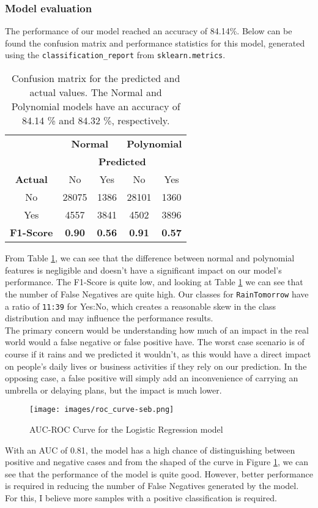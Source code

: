\documentclass[10pt]{article}
\begin{document}
\subsubsection{Model evaluation}
The performance of our model reached an accuracy of 84.14\%. Below can be found the confusion matrix and performance statistics for this model, generated using the \texttt{classification\_report} from \texttt{sklearn.metrics}.
\begin{table}[h]
    \centering
    \begin{tabular}{ccccc} 
 & \multicolumn{2}{c}{\textbf{Normal}}& \multicolumn{2}{c}{\textbf{Polynomial}} \\ 
  &\multicolumn{4}{c}{\textbf{Predicted}} \\ 
          \textbf{Actual}&  No& Yes  & No&Yes \\ 
          No&  28075& 1386& 28101&1360 \\ 
          Yes&  4557& 3841& 4502&3896 \\
 \textbf{F1-Score}& \textbf{0.90}& \textbf{0.56}& \textbf{0.91}& \textbf{0.57}\\ 
    \end{tabular}
    \caption{Confusion matrix for the predicted and actual values. The Normal and Polynomial models have an accuracy of 84.14 \% and 84.32 \%, respectively. }
    \label{tab:confusion_matrix_lreg}
\end{table}
\noindent From Table \ref{tab:confusion_matrix_lreg}, we can see that the difference between normal and polynomial features is negligible and doesn't have a significant impact on our model's performance. The F1-Score is quite low, and looking at Table \ref{tab:confusion_matrix_lreg} we can see that the number of False Negatives are quite high. Our classes for \texttt{RainTomorrow} have a ratio of \texttt{11:39} for Yes:No, which creates a reasonable skew in the class distribution and may influence the performance results. \\
The primary concern would be understanding how much of an impact in the real world would a false negative or false positive have. The worst case scenario is of course if it rains and we predicted it wouldn't, as this would have a direct impact on people's daily lives or business activities if they rely on our prediction. In the opposing case, a false positive will simply add an inconvenience of carrying an umbrella or delaying plans, but the impact is much lower.
\begin{figure}[h]
    \centering
    \texttt{[image: images/roc\_curve-seb.png]}
    \caption{AUC-ROC Curve for the Logistic Regression model}
    \label{fig:roc-seb}
\end{figure}
With an AUC of 0.81, the model has a high chance of distinguishing between positive and negative cases and from the shaped of the curve in Figure \ref{fig:roc-seb}, we can see that the performance of the model is quite good. However, better performance is required in reducing the number of False Negatives generated by the model. For this, I believe more samples with a positive classification is required.
\end{document}
